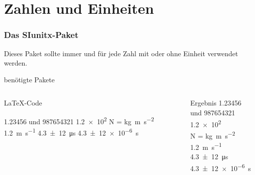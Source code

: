 \section{Zahlen und Einheiten}
\begin{frame}[fragile]
    \frametitle{Das SIunitx-Paket}
    Dieses Paket sollte immer und für jede Zahl mit oder ohne Einheit verwendet werden.

   \begin{block}{benötigte Pakete}
    \begin{lstverbatim}
        \usepackage[locale=DE, separate-uncertainty=true, per-mode=fraction]
                   {siunitx}
    \end{lstverbatim}
   \end{block}
    \begin{columns}[T]
        \begin{column}{0.6\textwidth}
            \begin{block}{\LaTeX-Code}
                \begin{lstverbatim}
                \num{1.23456} und \num{987654321}
                \num{1.2e2}
                \si{\newton} = \si{\kilo\gram\metre\per\second\squared}
                \SI{1.2}{\metre\per\second}
                \SI{4,3(12)}{\micro\second}
                \SI{4,3(12)e-6}{\second}
                \end{lstverbatim}
            \end{block}
        \end{column}
        \begin{column}{0.35\textwidth}
            \begin{block}{Ergebnis}
                \num{1.23456} und \num{987654321} \\
                \num{1.2e2} \\
                \smallbreak
                \si{\newton} = \si{\kilo\gram\metre\per\second\squared} \\
                \medbreak
                \SI{1.2}{\metre\per\second} \\
                \SI{4,3(12)}{\micro\second}
                \SI{4,3(12)e-6}{\second}
            \end{block}
        \end{column}
    \end{columns}
\end{frame}

